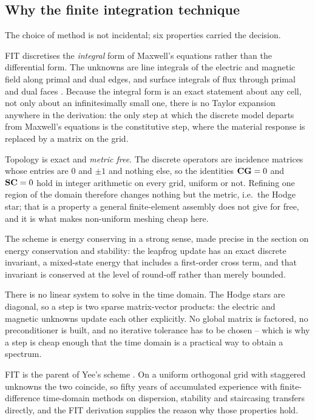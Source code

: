 \subsection{Why the finite integration technique}

The choice of method is not incidental; six properties carried the decision.

FIT discretises the \emph{integral} form of Maxwell's equations rather than the differential form. The unknowns
are line integrals of the electric and magnetic field along primal and dual edges, and surface integrals of flux
through primal and dual faces \cite{weiland1977,clemens2001}. Because the integral form is an exact statement
about any cell, not only about an infinitesimally small one, there is no Taylor expansion anywhere in the
derivation: the only step at which the discrete model departs from Maxwell's equations is the constitutive step,
where the material response is replaced by a matrix on the grid.

Topology is exact and \emph{metric free}. The discrete operators are incidence matrices whose entries are $0$ and
$\pm 1$ and nothing else, so the identities $\mathbf{C}\mathbf{G} = 0$ and $\mathbf{S}\mathbf{C} = 0$ hold in integer arithmetic on
every grid, uniform or not. Refining one region of the domain therefore changes nothing but the metric, i.e.\ the
Hodge star; that is a property a general finite-element assembly does not give for free, and it is what makes
non-uniform meshing cheap here.

The scheme is energy conserving in a strong sense, made precise in the section on energy conservation and stability: the leapfrog update
has an exact discrete invariant, a mixed-state energy that includes a first-order cross term, and that invariant
is conserved at the level of round-off rather than merely bounded.

There is no linear system to solve in the time domain. The Hodge stars are diagonal, so a step is two sparse
matrix-vector products: the electric and magnetic unknowns update each other explicitly. No global matrix is
factored, no preconditioner is built, and no iterative tolerance has to be chosen -- which is why a step is cheap
enough that the time domain is a practical way to obtain a spectrum.

FIT is the parent of Yee's scheme \cite{yee1966}. On a uniform orthogonal grid with staggered unknowns the two
coincide, so fifty years of accumulated experience with finite-difference time-domain methods on dispersion,
stability and staircasing \cite{taflove2005} transfers directly, and the FIT derivation supplies the reason why
those properties hold.

